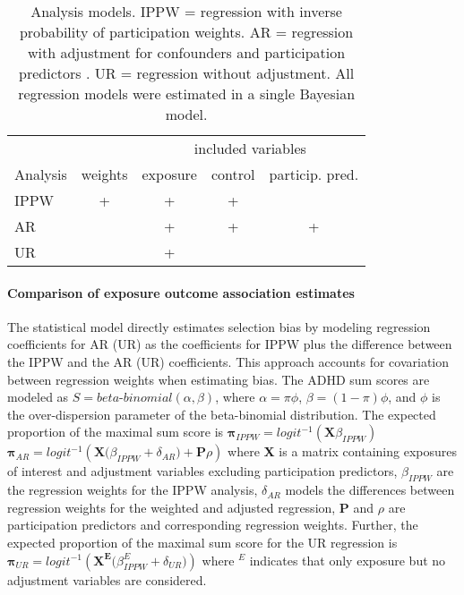 \documentclass[12pt]{article}
\begin{document}
\begin{table}
	\centering
	\begin{tabular}{lcccc}
		\hline
		& & \multicolumn{3}{c}{included variables} \\ \cline{3-5}
		Analysis & weights & exposure  & control  & particip. pred. \\ 
		\hline
		IPPW     &    +    &         +          &         +          & \\
		AR       &         &         +          &         +          &  + \\
		UR       &         &         +          &                   & \\
		\hline
	\end{tabular}
	\caption{Analysis models. IPPW = regression with inverse probability of participation weights. AR = regression with adjustment for confounders and participation predictors . UR = regression without adjustment. All regression models were estimated in a single Bayesian model.} 
	\label{tab:regmodels}
\end{table}

\paragraph{Comparison of exposure outcome association estimates} The statistical model directly estimates selection bias by modeling regression coefficients for AR (UR) as the coefficients for IPPW plus the difference between the IPPW and the AR (UR) coefficients. This approach accounts for covariation between regression weights when estimating bias. The ADHD sum scores are modeled as  $S = beta$-$binomial(\alpha,\beta)$, where $\alpha = \pi\phi$, $\beta = (1-\pi)\phi$, and $\phi$ is the over-dispersion parameter of the beta-binomial distribution. The expected proportion of the maximal sum score is 
\newline
$\mathbf{\pi}_{IPPW} = logit^{-1}(\mathbf{X} \beta_{IPPW})$ 
\newline
$\mathbf{\pi}_{AR} = logit^{-1}(\mathbf{X} \big( \beta_{IPPW} + \delta_{AR} \big) + \mathbf{P}\rho)$
\newline
where \textbf{X} is a matrix containing exposures of interest and adjustment variables excluding participation predictors, $\beta_{IPPW}$ are the regression weights for the IPPW analysis, $\delta_{AR}$ models the differences between regression weights for the weighted and adjusted regression, \textbf{P} and $\rho$ are participation predictors and corresponding regression weights. Further, the expected proportion of the maximal sum score for the UR regression is
\newline
$\mathbf{\pi}_{UR} = logit^{-1}(\mathbf{X^E} \big( \beta^E_{IPPW} + \delta_{UR} \big))$
\newline
where $^E$ indicates that only exposure but no adjustment variables are considered.
\end{document}
